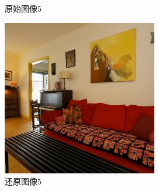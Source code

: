 \begin{figure}[H]
\begin{minipage}[b]{0.3\linewidth}
    \caption{原始图像5}
    \label{original image  5}
  \end{minipage}
\hspace{0.1cm}
  \begin{minipage}[b]{0.3\linewidth}
    \includegraphics[width=\linewidth]{Picture/recon/00007.png}
    \caption{还原图像5}
    \label{inpainted image 5}
  \end{minipage}
  \label{整块损坏图像}
\end{figure}

